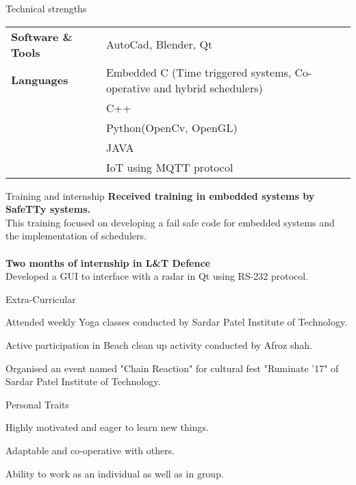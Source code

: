 \documentclass{resume} %
\begin{document}
\begin{rSection}{Technical strengths}
\begin{tabular}{ @{} >{\bfseries}l @{\hspace{6ex}} l }
Software \& Tools \ & AutoCad, Blender, Qt \\
Languages & Embedded C (Time triggered systems, Co-operative and hybrid schedulers)\\ & C++\\ & Python(OpenCv, OpenGL) \\ & JAVA \\ & IoT using MQTT protocol \\
\end{tabular}
\end{rSection}

\begin{rSection}{Training and internship}
{\bf Received training in embedded systems by SafeTTy systems.}
\\This training focused on developing a fail safe code for embedded systems and the implementation of schedulers.\\
\\{\bf Two months of internship in L\&T Defence}
\\Developed a GUI to interface with a radar in Qt using RS-232 protocol.
\end{rSection}

\newpage
\begin{rSection}{Extra-Curricular} \itemsep -3pt
\item Attended weekly Yoga classes conducted by Sardar Patel Institute of Technology.
\item Active participation in Beach clean up activity conducted by Afroz shah.
\item Organised an event named "Chain Reaction" for cultural fest "Ruminate '17" of Sardar Patel Institute of Technology.
\end{rSection}

\begin{rSection}{Personal Traits}
\item Highly motivated and eager to learn new things.
\item Adaptable and co-operative with others.
\item Ability to work as an individual as well as in group.
\end{rSection}
\end{document}
